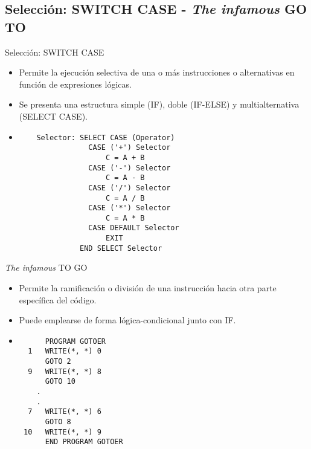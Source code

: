 
\subsection{Selección: SWITCH CASE - \textit{The infamous} GO TO}

\begin{frame}[fragile]{Selección: SWITCH CASE}  
 \begin{itemize}[<+(0)->]
  \item Permite la ejecución selectiva de una o más instrucciones o alternativas en función de expresiones lógicas.
  \item Se presenta una estructura simple (IF), doble (IF-ELSE) y multialternativa (SELECT CASE).
  \vspace{0.2cm}
  \item [] 
   \begin{verbatim}
    Selector: SELECT CASE (Operator)
                CASE ('+') Selector
                    C = A + B
                CASE ('-') Selector
                    C = A - B
                CASE ('/') Selector
                    C = A / B
                CASE ('*') Selector
                    C = A * B
                CASE DEFAULT Selector
                    EXIT
              END SELECT Selector
   \end{verbatim}
 \end{itemize}
\end{frame}


\begin{frame}[fragile]{\textit{The infamous} TO GO}  
 \begin{itemize}[<+(0)->]
  \item Permite la ramificación o división de una instrucción hacia otra parte específica del código.
  \item Puede emplearse de forma lógica-condicional junto con IF. 
  \vspace{0.2cm}
  \item [] 
   \begin{verbatim}
      PROGRAM GOTOER
  1   WRITE(*, *) 0
      GOTO 2
  9   WRITE(*, *) 8
      GOTO 10
    .
    .
  7   WRITE(*, *) 6
      GOTO 8
 10   WRITE(*, *) 9
      END PROGRAM GOTOER
   \end{verbatim}
 \end{itemize}
\end{frame}